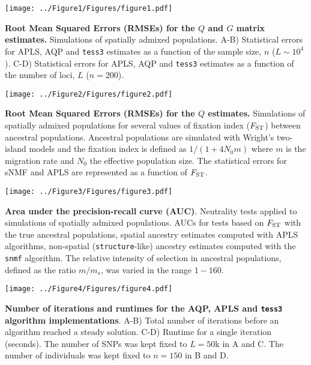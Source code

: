 \clearpage 
\newpage


\begin{center}
\texttt{[image: ../Figure1/Figures/figure1.pdf]}
\end{center}  
 {\bf Root Mean Squared Errors (RMSEs) for the $Q$ and $G$ matrix estimates.} Simulations of spatially admixed populations. A-B) Statistical errors for APLS, AQP and {\tt tess3} estimates as a function of the sample size, $n$ ($L \sim 10^4$). C-D) Statistical errors for APLS, AQP and {\tt tess3} estimates as a function of the number of loci, $L$ ($n = 200$).

\clearpage 
\newpage


\begin{center}
\texttt{[image: ../Figure2/Figures/figure2.pdf]}
\end{center}  
 {\bf Root Mean Squared Errors (RMSEs) for the $Q$ estimates.} Simulations of spatially admixed populations for several values of fixation index ($F_{\rm ST}$) between ancestral populations. Ancestral populations are simulated with Wright's two-island models and the fixation index is defined as $1 / (1 + 4 N_0 m)$ where $m$ is the migration rate and $N_0$ the effective population size. The statistical errors for sNMF and APLS are represented as a function of $F_{\rm ST}$. 

\clearpage 
\newpage

\begin{center}
\texttt{[image: ../Figure3/Figures/figure3.pdf]}
\end{center}
 {\bf Area under the precision-recall curve (AUC)}. Neutrality tests applied to simulations of spatially admixed populations. AUCs for tests based on $F_{\rm ST}$ with the true ancestral populations,  spatial ancestry estimates computed with APLS algorithms, non-spatial ({\tt structure}-like) ancestry estimates computed with the {\tt snmf} algorithm. The relative intensity of selection in ancestral populations, defined as the ratio $m/m_s$, was varied in the range $1-160$.


\clearpage 
\newpage

\begin{center}
\texttt{[image: ../Figure4/Figures/figure4.pdf]}
\end{center}
 {\bf Number of iterations and runtimes for the AQP, APLS and {\tt tess3} algorithm implementations}. A-B)   Total number of iterations before an algorithm reached a steady solution. C-D) Runtime for a single iteration (seconds). The number of SNPs was kept fixed to $L = 50$k in A and C. The number of individuals was kept fixed to $n = 150$ in B and D.


